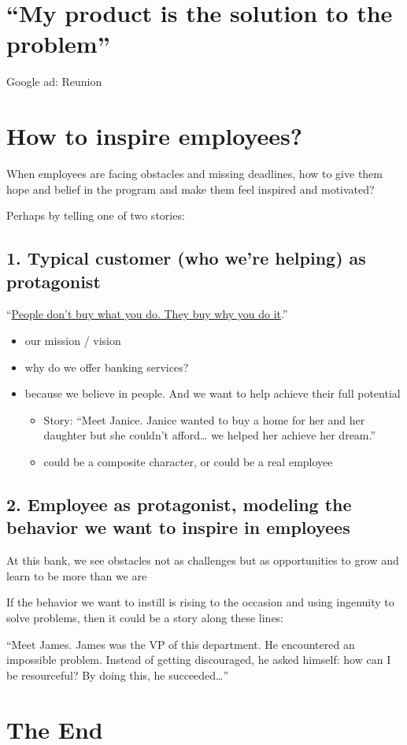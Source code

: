 \documentclass[12pt]{article}
\begin{document}
\section{``My product is the solution to the problem''}
\label{sec:org6b69237}
Google ad: Reunion

\section{How to inspire employees?}
\label{sec:org38c9253}

When employees are facing obstacles and missing deadlines, how to give them hope and belief in the program and make them feel inspired and motivated?

Perhaps by telling one of two stories:

\subsection{1. Typical customer (who we're helping) as protagonist}
\label{sec:org35f9dc4}
``\href{https://www.youtube.com/watch?v=u4ZoJKF\_VuA}{People don't buy what you do. They buy why you do it}.''

\begin{itemize}
\item our mission / vision
\item why do we offer banking services?
\item because we believe in people. And we want to help achieve their full potential
\begin{itemize}
\item Story: ``Meet Janice. Janice wanted to buy a home for her and her daughter but she couldn't afford\ldots{} we helped her achieve her dream.''
\item could be a composite character, or could be a real employee
\end{itemize}
\end{itemize}

\subsection{2. Employee as protagonist, modeling the behavior we want to inspire in employees}
\label{sec:orgfbe5a73}
At this bank, we see obstacles not as challenges but as opportunities to grow and learn to be more than we are

If the behavior we want to instill is rising to the occasion and using ingenuity to solve problems, then it could be a story along these lines:

``Meet James. James was the VP of this department. He encountered an impossible problem. Instead of getting discouraged, he asked himself: how can I be resourceful? By doing this, he succeeded\ldots{}''


\section{The End}
\label{sec:org6b810fd}
\end{document}

